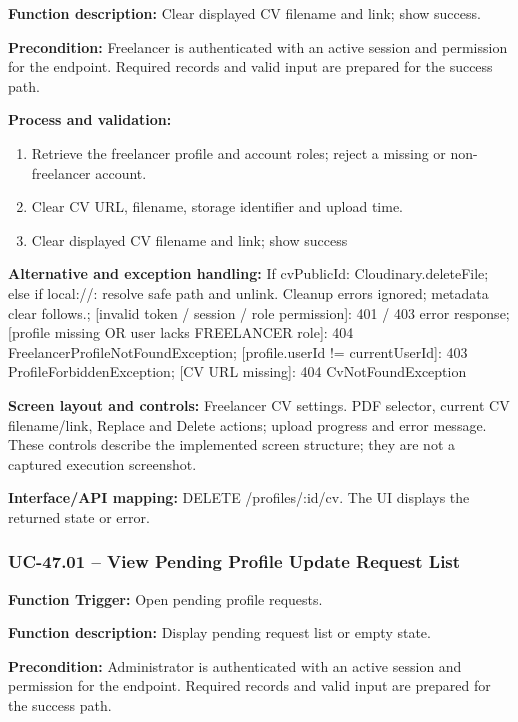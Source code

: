 \textbf{Function description:} Clear displayed CV filename and link; show success.

\textbf{Precondition:} Freelancer is authenticated with an active session and permission for the endpoint. Required records and valid input are prepared for the success path.

\textbf{Process and validation:}
\begin{enumerate}
\item Retrieve the freelancer profile and account roles; reject a missing or non-freelancer account.
\item Clear CV URL, filename, storage identifier and upload time.
\item Clear displayed CV filename and link; show success
\end{enumerate}
\textbf{Alternative and exception handling:} If cv\allowbreak{}Public\allowbreak{}Id: Cloudinary.delete\allowbreak{}File; else if local:/\allowbreak{}/\allowbreak{}: resolve safe path and unlink. Cleanup errors ignored; metadata clear follows.; [invalid token /\allowbreak{} session /\allowbreak{} role permission]: 401 /\allowbreak{} 403 error response; [profile missing OR user lacks FREELANCER role]: 404 Freelancer\allowbreak{}Profile\allowbreak{}Not\allowbreak{}Found\allowbreak{}Exception; [profile.user\allowbreak{}Id !=\allowbreak{} current\allowbreak{}User\allowbreak{}Id]: 403 Profile\allowbreak{}Forbidden\allowbreak{}Exception; [CV URL missing]: 404 Cv\allowbreak{}Not\allowbreak{}Found\allowbreak{}Exception

\textbf{Screen layout and controls:} Freelancer CV settings. PDF selector, current CV filename/\allowbreak{}link, Replace and Delete actions; upload progress and error message. These controls describe the implemented screen structure; they are not a captured execution screenshot.

\textbf{Interface/\allowbreak{}API mapping:} DELETE /\allowbreak{}profiles/\allowbreak{}:id/\allowbreak{}cv. The UI displays the returned state or error.

\subsubsection{UC-47.01 -- View Pending Profile Update Request List}
\textbf{Function Trigger:} Open pending profile requests.

\textbf{Function description:} Display pending request list or empty state.

\textbf{Precondition:} Administrator is authenticated with an active session and permission for the endpoint. Required records and valid input are prepared for the success path.


